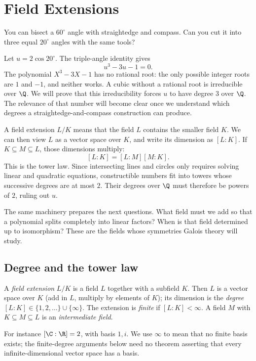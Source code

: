 \chapter{Field Extensions}

You can bisect a $60^\circ$ angle with straightedge and compass. Can you cut it into three equal $20^\circ$ angles with the same tools?

Let $u=2\cos20^\circ$. The triple-angle identity gives
\[
u^3-3u-1=0.
\]
The polynomial $X^3-3X-1$ has no rational root: the only possible integer roots are $1$ and $-1$, and neither works. A cubic without a rational root is irreducible over $\Q$. We will prove that this irreducibility forces $u$ to have degree $3$ over $\Q$. The relevance of that number will become clear once we understand which degrees a straightedge-and-compass construction can produce.

A field extension $L/K$ means that the field $L$ contains the smaller field $K$. We can then view $L$ as a vector space over $K$, and write its dimension as $[L:K]$. If $K\subseteq M\subseteq L$, those dimensions multiply:
\[
[L:K]=[L:M][M:K].
\]
This is the tower law. Since intersecting lines and circles only requires solving linear and quadratic equations, constructible numbers fit into towers whose successive degrees are at most $2$. Their degrees over $\Q$ must therefore be powers of $2$, ruling out $u$.

The same machinery prepares the next questions. What field must we add so that a polynomial splits completely into linear factors? When is that field determined up to isomorphism? These are the fields whose symmetries Galois theory will study.

\section{Degree and the tower law}

\begin{definition}
A \emph{field extension} $L/K$ is a field $L$ together with a subfield $K$. Then $L$ is a vector space over $K$ (add in $L$, multiply by elements of $K$); its dimension is the \emph{degree} $[L:K]\in\{1,2,\dots\}\cup\{\infty\}$. The extension is \emph{finite} if $[L:K]<\infty$. A field $M$ with $K\subseteq M\subseteq L$ is an \emph{intermediate field}.
\end{definition}

For instance $[\C:\R]=2$, with basis $1,i$. We use $\infty$ to mean
that no finite basis exists; the finite-degree arguments below need no theorem
asserting that every infinite-dimensional vector space has a basis.

